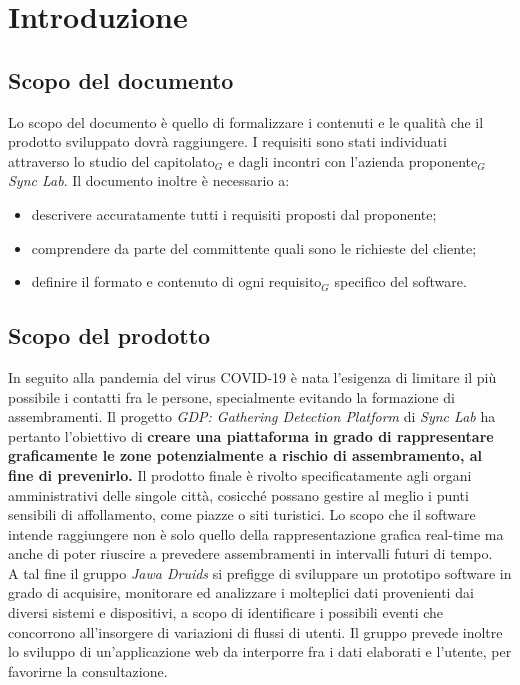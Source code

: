 \chapter{Introduzione}\label{Introduzione}

\section{Scopo del documento}\label{IntroduzioneScopoDelDocumento}
Lo scopo del documento è quello di formalizzare i contenuti e le qualità che il prodotto sviluppato dovrà raggiungere.
I requisiti sono stati individuati attraverso lo studio del capitolato$_G$ e dagli incontri con l'azienda proponente$_G$ \textit{Sync Lab}.
Il documento inoltre è necessario a:
\begin{itemize}
	\item descrivere accuratamente tutti i requisiti proposti dal proponente;
	\item comprendere da parte del committente quali sono le richieste del cliente;
	\item definire il formato e contenuto di ogni requisito$_G$ specifico del software.
\end{itemize}
\section{Scopo del prodotto}\label{IntroduzioneScopodelProdotto}
In seguito alla pandemia del virus COVID-19 è nata l'esigenza di limitare il più possibile i
contatti fra le persone, specialmente evitando la formazione di assembramenti.
Il progetto \textit{GDP: Gathering Detection Platform} di \textit{Sync Lab} ha pertanto l'obiettivo di \textbf{creare una piattaforma in grado di rappresentare graficamente le zone potenzialmente a rischio di assembramento, al fine di prevenirlo.} Il prodotto finale è rivolto specificatamente agli
organi amministrativi delle singole città, cosicché possano gestire al meglio i punti sensibili di affollamento, come piazze o siti turistici. Lo scopo che il software intende raggiungere non è
solo quello della rappresentazione grafica real-time ma anche di poter riuscire a prevedere
assembramenti in intervalli futuri di tempo.
\\
A tal fine il gruppo \textit{Jawa Druids} si prefigge di sviluppare un prototipo software in grado di acquisire, monitorare ed analizzare i molteplici dati provenienti dai diversi sistemi e dispositivi, a scopo di identificare i possibili eventi che concorrono all'insorgere di variazioni di flussi di utenti. Il gruppo prevede inoltre lo sviluppo di un'applicazione web da interporre fra i dati elaborati e l'utente, per favorirne la consultazione.
